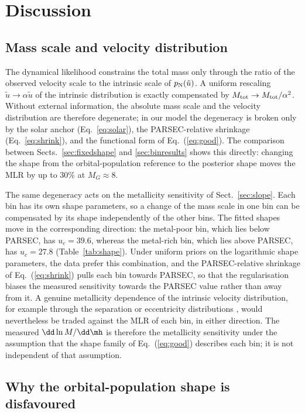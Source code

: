 \section{Discussion}
\label{sec:discussion}

\subsection{Mass scale and velocity distribution}
\label{sec:degeneracy}

The dynamical likelihood constrains the total mass only through the ratio of
the observed velocity scale to the intrinsic scale of $p_{\rm N}(\tilde u)$.
A uniform rescaling $\tilde u\to\alpha\tilde u$ of the intrinsic distribution
is exactly compensated by $M_{\rm tot}\to M_{\rm tot}/\alpha^2$.  Without
external information, the absolute mass scale and the velocity distribution
are therefore degenerate; in our model the degeneracy is broken only by the
solar anchor (Eq.~\ref{eq:solar}), the PARSEC-relative shrinkage
(Eq.~\ref{eq:shrink}), and the functional form of Eq.~(\ref{eq:good}).
The comparison between Sects.~\ref{sec:fixedshape} and \ref{sec:binresults}
shows this directly: changing the shape from the orbital-population
reference to the posterior shape moves the MLR by up to 30\% at $M_G\approx8$.

The same degeneracy acts on the metallicity sensitivity of
Sect.~\ref{sec:slope}.  Each bin has its own shape parameters, so a change
of the mass scale in one bin can be compensated by its shape independently
of the other bins.  The fitted shapes move in the corresponding direction:
the metal-poor bin, which lies below PARSEC, has $u_c=39.6$, whereas the
metal-rich bin, which lies above PARSEC, has $u_c=27.8$
(Table~\ref{tab:shape}).  Under uniform priors on the logarithmic shape
parameters, the data prefer this combination, and the PARSEC-relative
shrinkage of Eq.~(\ref{eq:shrink}) pulls each bin towards PARSEC, so that the
regularisation biases the measured sensitivity towards the PARSEC value
rather than away from it.  A genuine metallicity dependence of the intrinsic
velocity distribution, for example through the separation or eccentricity
distributions \citep{Hwang2021,Hwang2022}, would nevertheless be traded
against the MLR of each bin, in either direction.  The measured
$\dd\ln M/\dd\mh$ is therefore the metallicity sensitivity under the
assumption that the shape family of Eq.~(\ref{eq:good}) describes each bin;
it is not independent of that assumption.

\subsection{Why the orbital-population shape is disfavoured}

